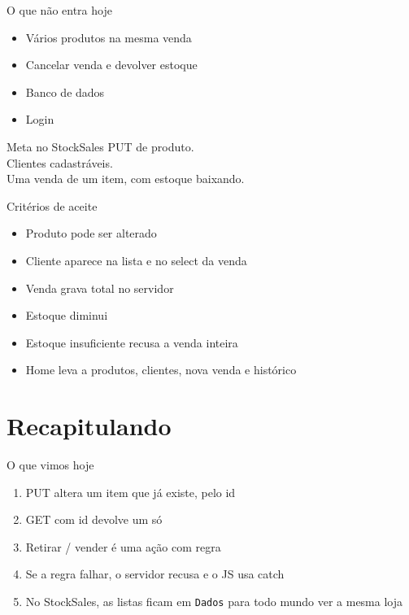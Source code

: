 \documentclass[aspectratio=169,11pt]{beamer}
\begin{document}
\begin{frame}{O que não entra hoje}
  \begin{itemize}
    \item Vários produtos na mesma venda
    \item Cancelar venda e devolver estoque
    \item Banco de dados
    \item Login
  \end{itemize}

  \vspace{0.5em}
  \begin{block}{Meta no StockSales}
    PUT de produto.\\
    Clientes cadastráveis.\\
    Uma venda de um item, com estoque baixando.
  \end{block}
\end{frame}

\begin{frame}{Critérios de aceite}
  \begin{itemize}
    \item [ ] Produto pode ser alterado
    \item [ ] Cliente aparece na lista e no select da venda
    \item [ ] Venda grava total no servidor
    \item [ ] Estoque diminui
    \item [ ] Estoque insuficiente recusa a venda inteira
    \item [ ] Home leva a produtos, clientes, nova venda
              e histórico
  \end{itemize}
\end{frame}

\section{Recapitulando}

\begin{frame}{O que vimos hoje}
  \begin{enumerate}
    \item PUT altera um item que já existe, pelo id
    \item GET com id devolve um só
    \item Retirar / vender é uma ação com regra
    \item Se a regra falhar, o servidor recusa e o JS usa catch
    \item No StockSales, as listas ficam em \texttt{Dados}
          para todo mundo ver a mesma loja
  \end{enumerate}
\end{frame}
\end{document}

